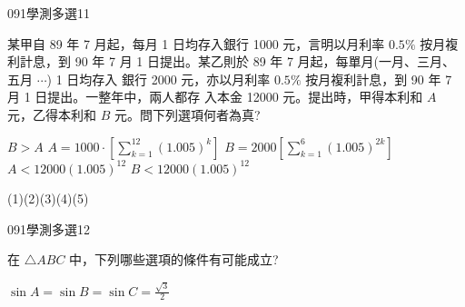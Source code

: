 \begin{QUESTIONS}
\begin{QUESTION}
    \end{QUESTION}
    \begin{QUESTION}
        \begin{ExamInfo}{091}{學測}{多選}{11}
        \end{ExamInfo}
        \begin{ExamAnsRateInfo}{16}{30}{12}{6}
        \end{ExamAnsRateInfo}
        \begin{QBODY}
            某甲自 89 年 7 月起，每月 1 日均存入銀行 1000 元，言明以月利率 $0.5\%$ 按月複利計息，到 90 年 7 月 1 日提出。某乙則於 89 年 7 月起，每單月(一月、三月、五月 $\cdots$) 1 日均存入 銀行 2000 元，亦以月利率 $0.5\%$ 按月複利計息，到 90 年 7 月 1 日提出。一整年中，兩人都存 入本金 12000 元。提出時，甲得本利和 $A$ 元，乙得本利和 $B$ 元。問下列選項何者為真? 
            \begin{QOPS} 
                \QOP $B>A$ 
                \QOP $A= 1000\cdot [\sum_{k=1}^{12} (1.005)^k ]$ 
                \QOP $B= 2000 [\sum_{k=1}^{6} (1.005)^{2k}] $ 
                \QOP $A< 12000 (1.005)^{12}$  
                \QOP $B< 12000 (1.005)^{12}$
            \end{QOPS}
        \end{QBODY}
        \begin{QFROMS}
        \end{QFROMS}
        \begin{QTAGS}\end{QTAGS}
        \begin{QANS}
            (1)(2)(3)(4)(5)
        \end{QANS}
        \begin{QSOLLIST}
        \end{QSOLLIST}
        \begin{QEMPTYSPACE}
        \end{QEMPTYSPACE}
    \end{QUESTION}
    \begin{QUESTION}
        \begin{ExamInfo}{091}{學測}{多選}{12}
        \end{ExamInfo}
        \begin{ExamAnsRateInfo}{36}{67}{29}{12}
        \end{ExamAnsRateInfo}
        \begin{QBODY}
            在 $\triangle ABC$ 中，下列哪些選項的條件有可能成立?
            \begin{QOPS} 
                \QOP $\sin A=\sin B= \sin C= \frac{\sqrt{3}}{2}$ 

\end{QOPS}
\end{QBODY}
\end{QUESTION}
\end{QUESTIONS}
